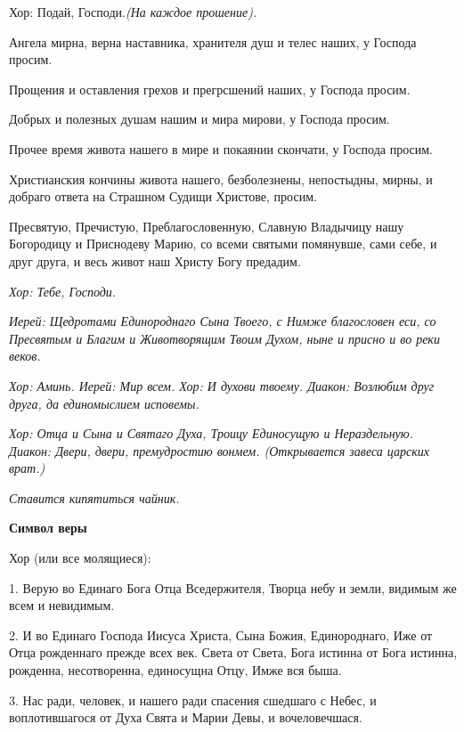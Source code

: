   Хор:\normalfont{} Подай, Господи.\itshape  (На каждое прошение)\normalfont{}. 


  Ангела мирна, верна наставника, хранителя душ и телес наших, у Господа просим. 


  Прощения и оставления грехов и прегрсшений наших, у Господа просим. 


  Добрых и полезных душам нашим и мира мирови, у Господа просим. 


  Прочее время живота нашего в мире и покаянии скончати, у Господа просим. 


  Христианския кончины живота нашего, безболезнены, непостыдны, мирны, и добраго ответа на Страшном Судищи Христове, просим. 


  Пресвятую, Пречистую, Преблагословенную, Славную Владычицу нашу Богородицу и Приснодеву Марию, со всеми святыми помянувше, сами себе, и друг друга, и весь живот наш Христу Богу предадим.


\itshape Хор:\normalfont{} Тебе, Господи.


\itshape Иерей:\normalfont{} Щедротами Единороднаго Сына Твоего, с Нимже благословен еси, со Пресвятым и Благим и Животворящим Твоим Духом, ныне и присно и во реки веков.


\itshape Хор:\normalfont{} Аминь. \itshape  Иерей:\normalfont{} Мир всем. \itshape  Хор:\normalfont{} И духови твоему. \itshape  Диакон:\normalfont{} Возлюбим друг друга, да единомыслием исповемы.


\itshape Хор:\normalfont{} Отца и Сына и Святаго Духа, Троицу Единосущую и Нераздельную. \itshape  Диакон:\normalfont{} Двери, двери, премудростию вонмем. \itshape  (Открывается завеса царских врат\normalfont{}.)

 


\itshape  Ставится кипятиться чайник\normalfont{}. 


\medskip


 \bfseries  Символ веры \normalfont{}


  Хор (или все молящиеся):


  1. Верую во Единаго Бога Отца Вседержителя, Творца небу и земли, видимым же всем и невидимым. 


  2. И во Единаго Господа Иисуса Христа, Сына Божия, Единороднаго, Иже от Отца рожденнаго прежде всех век. Света от Света, Бога истинна от Бога истинна, рожденна, несотворенна, единосущна Отцу, Имже вся быша.


  3. Нас ради, человек, и нашего ради спасения сшедшаго с Небес, и воплотившагося от Духа Свята и Марии Девы, и вочеловечшася.


